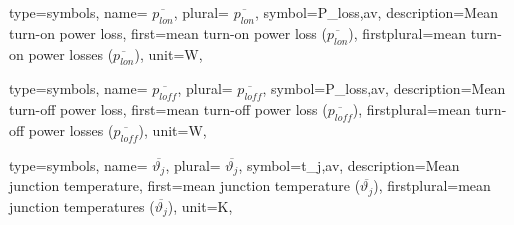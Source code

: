 {
	type=symbols,
	name= $\overline{p_{lon}}$, 
	plural= $\overline{p_{lon}}$, 
	symbol={P_{loss,av}},
	description={Mean turn-on power loss},
	first={mean turn-on power loss ($\overline{p_{lon}}$)},
	firstplural={mean turn-on power losses ($\overline{p_{lon}}$)},
	unit={\unit{\watt}},
}

{
	type=symbols,
	name= $\overline{p_{loff}}$, 
	plural= $\overline{p_{loff}}$,
	symbol={P_{loss,av}},
	description={Mean turn-off power loss},
	first={mean turn-off power loss ($\overline{p_{loff}}$)},
	firstplural={mean turn-off power losses ($\overline{p_{loff}}$)},
	unit={\unit{\watt}},
}

{
	type=symbols,
	name= $\overline{\vartheta_{j}}$, 
	plural= $\overline{\vartheta_{j}}$,
	symbol={t_{j,av}},
	description={Mean junction temperature},
	first={mean junction temperature ($\overline{\vartheta_{j}}$)},
	firstplural={mean junction temperatures ($\overline{\vartheta_{j}}$)},
	unit={\unit{\kelvin}},
}










